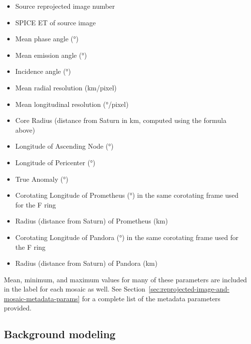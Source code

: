 \begin{itemize}
\item Source reprojected image number
\item SPICE ET of source image
\item Mean phase angle (°)
\item Mean emission angle (°)
\item Incidence angle (°)
\item Mean radial resolution (km/pixel)
\item Mean longitudinal resolution (°/pixel)
\item Core Radius (distance from Saturn in km, computed using the formula above)
\item Longitude of Ascending Node (°)
\item Longitude of Pericenter (°)
\item True Anomaly (°)
\item Corotating Longitude of Prometheus (°) in the same corotating frame used for the F ring
\item Radius (distance from Saturn) of Prometheus (km)
\item Corotating Longitude of Pandora (°) in the same corotating frame used for the F ring
\item Radius (distance from Saturn) of Pandora (km)
\end{itemize}
Mean, minimum, and maximum values for many of these parameters are included in the label for each mosaic as well. See Section~\ref{sec:reprojected-image-and-mosaic-metadata-params} for a complete list of the metadata parameters provided.


\subsection{Background modeling}
\label{sec:background-modeling}

